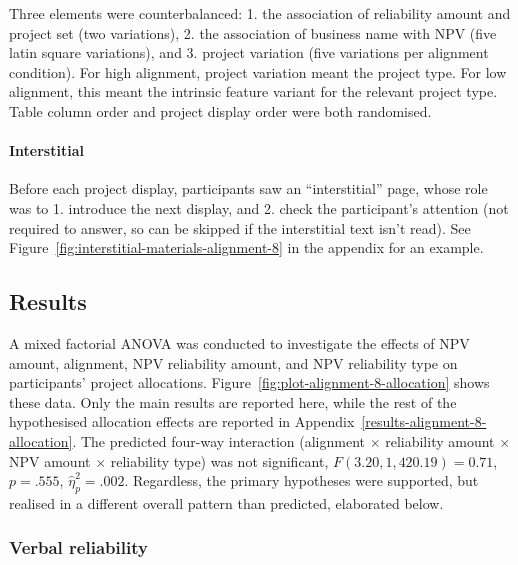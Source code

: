 \documentclass[a4paper, nobind, dvipsnames]{templates/ociamthesis}
\theoremstyle{definition}
\theoremstyle{definition}
\theoremstyle{definition}
\theoremstyle{definition}
\theoremstyle{remark}
\begin{document}
Three elements were counterbalanced: 1. the association of reliability amount
and project set (two variations), 2. the association of business name with NPV
(five latin square variations), and 3. project variation (five variations per
alignment condition). For high alignment, project variation meant the project
type. For low alignment, this meant the intrinsic feature variant for the
relevant project type. Table column order and project display order were both
randomised.

\paragraph{Interstitial}

Before each project display, participants saw an ``interstitial'' page, whose role
was to 1. introduce the next display, and 2. check the participant's attention
(not required to answer, so can be skipped if the interstitial text isn't read).
See Figure~\ref{fig:interstitial-materials-alignment-8} in the appendix for an
example.

\subsection{Results}

A mixed factorial ANOVA was conducted to investigate the effects of NPV amount,
alignment, NPV reliability amount, and NPV reliability type on participants'
project allocations. Figure~\ref{fig:plot-alignment-8-allocation} shows these
data. Only the main results are reported here, while the rest of the
hypothesised allocation effects are reported in
Appendix~\ref{results-alignment-8-allocation}. The predicted four-way
interaction (alignment \(\times\) reliability amount \(\times\) NPV amount \(\times\)
reliability type) was not significant,
\(F(3.20, 1,420.19) = 0.71\), \(p = .555\), \(\hat{\eta}^2_p = .002\). Regardless, the primary hypotheses
were supported, but realised in a different overall pattern than predicted,
elaborated below.

\subsubsection{Verbal reliability}
\end{document}
